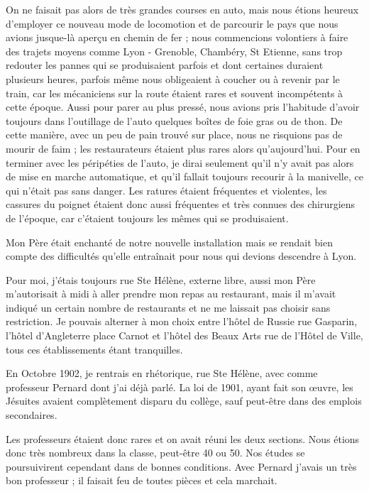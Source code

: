 \documentclass[11pt,a4paper]{report}
\begin{document}
On ne faisait pas alors de très grandes courses en auto, mais nous étions heureux d'employer ce nouveau mode de locomotion et de parcourir le pays que nous avions jusque-là aperçu en chemin de fer ; nous commencions volontiers à faire des trajets moyens comme Lyon - Grenoble, Chambéry, St Etienne, sans trop redouter les pannes qui se produisaient parfois et dont certaines duraient plusieurs heures, parfois même nous obligeaient à coucher ou à revenir par le train, car les mécaniciens sur la route étaient rares et souvent incompétents à cette époque. Aussi pour parer au plus pressé, nous avions pris l'habitude d'avoir toujours dans l'outillage de l'auto quelques boîtes de foie gras ou de thon. De cette manière, avec un peu de pain trouvé sur place, nous ne risquions pas de mourir de faim ; les restaurateurs étaient plus rares alors qu'aujourd'hui. Pour en terminer avec les péripéties de l'auto, je dirai seulement qu'il n'y avait pas alors de mise en marche automatique, et qu'il fallait toujours recourir à la manivelle, ce qui n'était pas sans danger. Les ratures étaient fréquentes et violentes, les cassures du poignet étaient donc aussi fréquentes et très connues des chirurgiens de l'époque, car c'étaient toujours les mêmes qui se produisaient.

Mon Père était enchanté de notre nouvelle installation mais se rendait bien compte des difficultés qu'elle entraînait pour nous qui devions descendre à Lyon.

Pour moi, j'étais toujours rue Ste Hélène, externe libre, aussi mon Père m'autorisait à midi à aller prendre mon repas au restaurant, mais il m'avait indiqué un certain nombre de restaurants et ne me laissait pas choisir sans restriction. Je pouvais alterner à mon choix entre l'hôtel de Russie rue Gasparin, l'hôtel d'Angleterre place Carnot et l'hôtel des Beaux Arts rue de l'Hôtel de Ville, tous ces établissements étant tranquilles.

En Octobre 1902, je rentrais en rhétorique, rue Ste Hélène, avec comme professeur Pernard dont j'ai déjà parlé. La loi de 1901, ayant fait son œuvre, les Jésuites avaient complètement disparu du collège, sauf peut-être dans des emplois secondaires.

Les professeurs étaient donc rares et on avait réuni les deux sections. Nous étions donc très nombreux dans la classe, peut-être 40 ou 50. Nos études se poursuivirent cependant dans de bonnes conditions. Avec Pernard j'avais un très bon professeur ; il faisait feu de toutes pièces et cela marchait.
\end{document}
